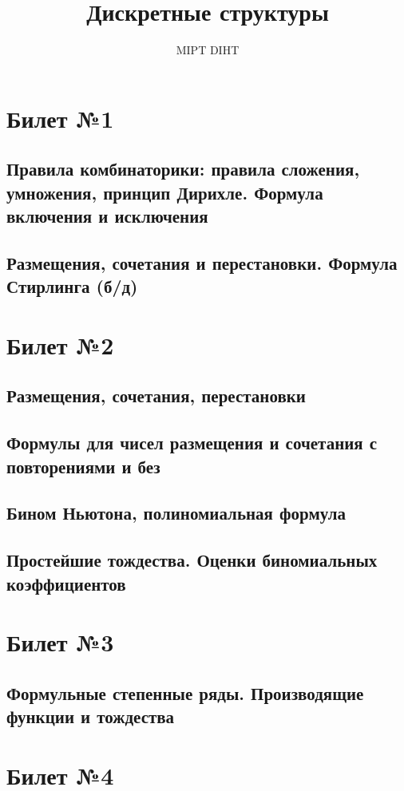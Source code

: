 \documentclass[a4paper]{article}
\title{Дискретные структуры}
\author{MIPT DIHT}
\begin{document}
\maketitle

\section{Билет №1}
\subsection{Правила комбинаторики: правила сложения, умножения, принцип Дирихле. Формула включения и исключения}
\subsection{Размещения, сочетания и перестановки. Формула Стирлинга (б/д)}

\section{Билет №2}
\subsection{Размещения, сочетания, перестановки}
\subsection{Формулы для чисел размещения и сочетания с повторениями и без}
\subsection{Бином Ньютона, полиномиальная формула}
\subsection{Простейшие тождества. Оценки биномиальных коэффициентов}

\section{Билет №3}
\subsection{Формульные степенные ряды. Производящие функции и тождества}

\section{Билет №4}
\end{document}
